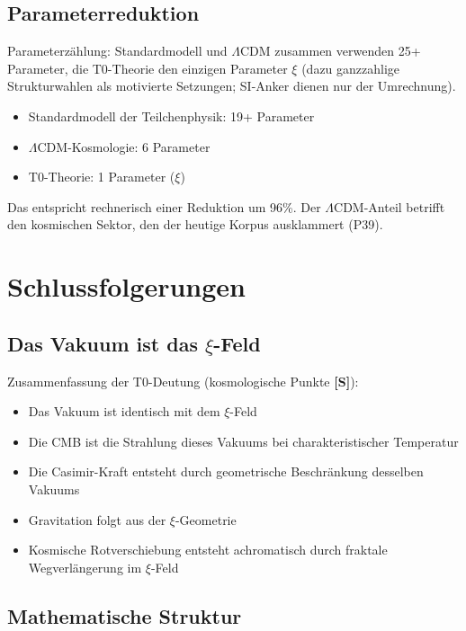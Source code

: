 	\subsection{Parameterreduktion}
	
	\begin{revolutionary}[Parameterzählung]
		Parameterzählung: Standardmodell und $\Lambda$CDM zusammen verwenden 25+ Parameter, die T0-Theorie den einzigen Parameter $\xi$ (dazu ganzzahlige Strukturwahlen als motivierte Setzungen; SI-Anker dienen nur der Umrechnung).
		\begin{itemize}
			\item Standardmodell der Teilchenphysik: 19+ Parameter
			\item $\Lambda$CDM-Kosmologie: 6 Parameter
			\item T0-Theorie: 1 Parameter ($\xi$)
		\end{itemize}
		Das entspricht rechnerisch einer Reduktion um 96\%. Der $\Lambda$CDM-Anteil betrifft den kosmischen Sektor, den der heutige Korpus ausklammert (P39).
	\end{revolutionary}
	
	\section{Schlussfolgerungen}

	\subsection{Das Vakuum ist das $\xi$-Feld}
	
	\begin{important}
		Zusammenfassung der T0-Deutung (kosmologische Punkte \textbf{[S]}):
		\begin{itemize}
			\item Das Vakuum ist identisch mit dem $\xi$-Feld
			\item Die CMB ist die Strahlung dieses Vakuums bei charakteristischer Temperatur
			\item Die Casimir-Kraft entsteht durch geometrische Beschränkung desselben Vakuums
			\item Gravitation folgt aus der $\xi$-Geometrie
			\item Kosmische Rotverschiebung entsteht achromatisch durch fraktale Wegverlängerung im $\xi$-Feld
		\end{itemize}
	\end{important}
	
	\subsection{Mathematische Struktur}
	
